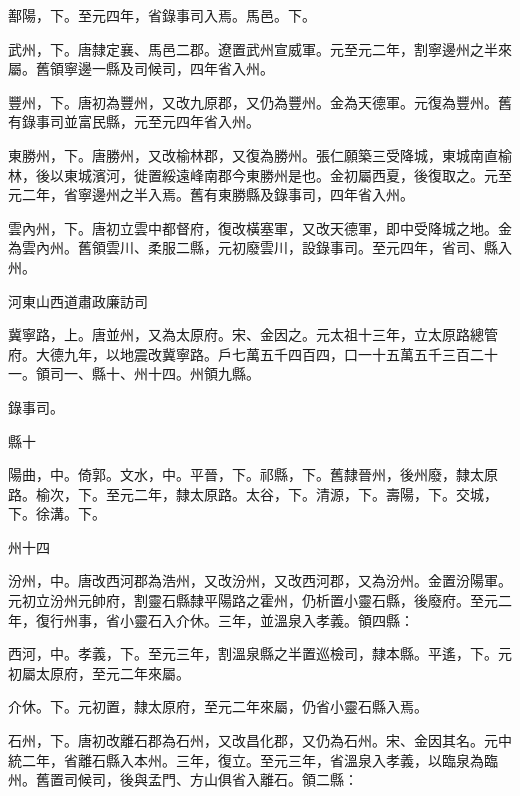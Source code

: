 \begin{pinyinscope}
 鄯陽，下。至元四年，省錄事司入焉。馬邑。下。



 武州，下。唐隸定襄、馬邑二郡。遼置武州宣威軍。元至元二年，割寧邊州之半來屬。舊領寧邊一縣及司候司，四年省入州。



 豐州，下。唐初為豐州，又改九原郡，又仍為豐州。金為天德軍。元復為豐州。舊有錄事司並富民縣，元至元四年省入州。



 東勝州，下。唐勝州，又改榆林郡，又復為勝州。張仁願築三受降城，東城南直榆林，後以東城濱河，徙置綏遠峰南郡今東勝州是也。金初屬西夏，後復取之。元至元二年，省寧邊州之半入焉。舊有東勝縣及錄事司，四年省入州。



 雲內州，下。唐初立雲中都督府，復改橫塞軍，又改天德軍，即中受降城之地。金為雲內州。舊領雲川、柔服二縣，元初廢雲川，設錄事司。至元四年，省司、縣入州。



 河東山西道肅政廉訪司



 冀寧路，上。唐並州，又為太原府。宋、金因之。元太祖十三年，立太原路總管府。大德九年，以地震改冀寧路。戶七萬五千四百四，口一十五萬五千三百二十一。領司一、縣十、州十四。州領九縣。



 錄事司。



 縣十



 陽曲，中。倚郭。文水，中。平晉，下。祁縣，下。舊隸晉州，後州廢，隸太原路。榆次，下。至元二年，隸太原路。太谷，下。清源，下。壽陽，下。交城，下。徐溝。下。



 州十四



 汾州，中。唐改西河郡為浩州，又改汾州，又改西河郡，又為汾州。金置汾陽軍。元初立汾州元帥府，割靈石縣隸平陽路之霍州，仍析置小靈石縣，後廢府。至元二年，復行州事，省小靈石入介休。三年，並溫泉入孝義。領四縣：



 西河，中。孝義，下。至元三年，割溫泉縣之半置巡檢司，隸本縣。平遙，下。元初屬太原府，至元二年來屬。



 介休。下。元初置，隸太原府，至元二年來屬，仍省小靈石縣入焉。



 石州，下。唐初改離石郡為石州，又改昌化郡，又仍為石州。宋、金因其名。元中統二年，省離石縣入本州。三年，復立。至元三年，省溫泉入孝義，以臨泉為臨州。舊置司候司，後與孟門、方山俱省入離石。領二縣：




\end{pinyinscope}
